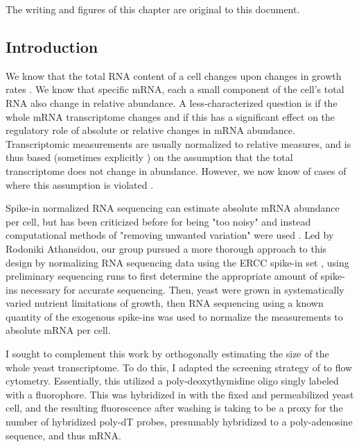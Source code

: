The writing and figures of this chapter are original to this document.

%
%
%
\subsection{Introduction}
%
%
%


We know that the total RNA content of a cell changes upon changes in
growth rates \parencite{waldron1975effect}.
We know that specific mRNA, each a small component of the cell's 
total RNA also change in relative abundance. A less-characterized 
question is if the whole mRNA transcriptome changes
and if this has a significant effect on the regulatory role
of absolute or relative changes in mRNA abundance.
Transcriptomic measurements are usually normalized to relative
measures, and is thus based (sometimes explicitly
\parencite{love2014moderated})
on the assumption that the total transcriptome does not change in 
abundance.  However, we now know of cases of where this 
assumption is violated \parencite{nie2012c}.

Spike-in normalized RNA sequencing can estimate absolute mRNA
abundance per cell, but has been criticized before for
being "too noisy" and instead computational methods of "removing
unwanted variation" were used \parencite{risso2014normalization}. 
Led by Rodoniki Athansidou, our group pursued a more thorough approach
to this design by normalizing RNA sequencing data using the ERCC
spike-in set \parencite{jiang2011synthetic}, 
using preliminary sequencing runs
to first determine the appropriate amount of spike-ins necessary for
accurate sequencing. Then, yeast were grown in systematically varied
nutrient limitations of growth, then RNA sequencing using a known
quantity of the exogenous spike-ins was used to normalize the
measurements to absolute mRNA per cell.

I sought to complement this work by orthogonally estimating the size 
of the whole yeast transcriptome. To do this, I adapted the screening 
strategy of \cite{amberg1992isolation} to flow cytometry. 
Essentially, this utilized a poly-deoxythymidine oligo singly labeled
with a fluorophore. This was hybridized in with the fixed and
permeabilized yeast cell, and the resulting fluorescence after washing
is taking to be a proxy for the number of hybridized poly-dT probes,
presumably hybridized to a poly-adenosine sequence, and thus mRNA.

